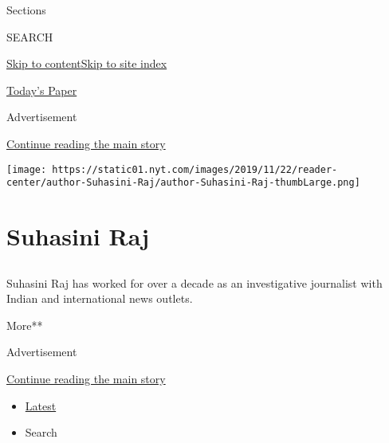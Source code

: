 Sections

SEARCH

\protect\hyperlink{site-content}{Skip to
content}\protect\hyperlink{site-index}{Skip to site index}

\href{https://myaccount.nytimes.com/auth/login?response_type=cookie\&client_id=vi}{}

\href{https://www.nytimes.com/section/todayspaper}{Today's Paper}

Advertisement

\protect\hyperlink{after-top}{Continue reading the main story}

\texttt{[image: https://static01.nyt.com/images/2019/11/22/reader-center/author-Suhasini-Raj/author-Suhasini-Raj-thumbLarge.png]}

\hypertarget{suhasini-raj}{%
\section{Suhasini Raj}\label{suhasini-raj}}

\subsection{}

Suhasini Raj has worked for over a decade as an investigative journalist
with Indian and international news outlets.~

More**

Advertisement

\protect\hyperlink{after-mid1}{Continue reading the main story}

\begin{itemize}
\tightlist
\item
  \protect\hyperlink{stream-panel}{Latest}
\item
  Search
\end{itemize}


